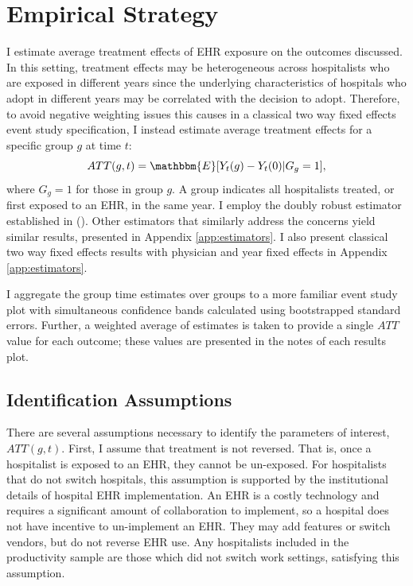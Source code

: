 \documentclass[12pt]{article}
\begin{document}
\section{Empirical Strategy}\label{sec:empstrat}

I estimate average treatment effects of EHR exposure on the outcomes discussed. In this setting, treatment effects may be heterogeneous across hospitalists who are exposed in different years since the underlying characteristics of hospitals who adopt in different years may be correlated with the decision to adopt. Therefore, to avoid negative weighting issues this causes in a classical two way fixed effects event study specification, I instead estimate average treatment effects for a specific group $g$ at time $t$: 
$$ATT(g,t)=\mathbbm{E}[Y_t(g)-Y_t(0)|G_g=1],$$
where $G_g=1$ for those in group $g$. A group indicates all hospitalists treated, or first exposed to an EHR, in the same year. I employ the doubly robust estimator established in \citeauthor{sant2020doubly} (\citeyear{sant2020doubly}). Other estimators that similarly address the concerns yield similar results, presented in Appendix \ref{app:estimators}. I also present classical two way fixed effects results with physician and year fixed effects in Appendix \ref{app:estimators}.

I aggregate the group time estimates over groups to a more familiar event study plot with simultaneous confidence bands calculated using bootstrapped standard errors. Further, a weighted average of estimates is taken to provide a single $ATT$ value for each outcome; these values are presented in the notes of each results plot. 

\subsection{Identification Assumptions}

There are several assumptions necessary to identify the parameters of interest, $ATT(g,t)$. First, I assume that treatment is not reversed. That is, once a hospitalist is exposed to an EHR, they cannot be un-exposed. For hospitalists that do not switch hospitals, this assumption is supported by the institutional details of hospital EHR implementation. An EHR is a costly technology and requires a significant amount of collaboration to implement, so a hospital does not have incentive to un-implement an EHR. They may add features or switch vendors, but do not reverse EHR use. Any hospitalists included in the productivity sample are those which did not switch work settings, satisfying this assumption.
\end{document}
